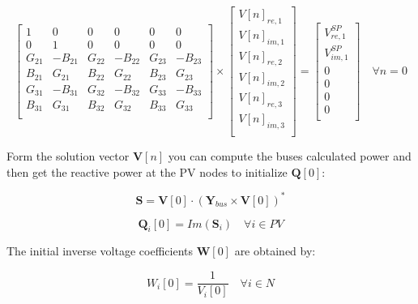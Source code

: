 \documentclass[nols,a4paper,twoside,notoc,fleqn]{tufte-book}
\begin{document}
\begin{equation}
\begin{bmatrix}
1 & 0 & 0 & 0 & 0 & 0\\
0 & 1 & 0 & 0 & 0 & 0\\
G_{21} & -B_{21} & G_{22} & -B_{22} & G_{23} & -B_{23}\\
B_{21} & G_{21}  & B_{22} & G_{22}  & B_{23} & G_{23}\\
G_{31} & -B_{31} & G_{32} & -B_{32} & G_{33} & -B_{33}\\
B_{31} & G_{31}  & B_{32} & G_{32}  & B_{33} & G_{33}\\
\end{bmatrix}
\times
\begin{bmatrix}
V[n]_{re, 1}\\
V[n]_{im, 1}\\
V[n]_{re, 2}\\
V[n]_{im, 2}\\
V[n]_{re, 3}\\
V[n]_{im, 3}\\
\end{bmatrix}
=
\begin{bmatrix}
V^{SP}_{re, 1}\\
V^{SP}_{im, 1}\\
0\\
0\\
0\\
0\\
\end{bmatrix}
\quad \forall n = 0
\end{equation}

Form the solution vector $\textbf{V}[n]$ you can compute the buses calculated power and then get the reactive power at the PV nodes to initialize $\textbf{Q}[0]$:

\begin{equation}
\textbf{S} = \textbf{V}[0] \cdot (\textbf{Y}_{bus} \times \textbf{V}[0])^*
\label{Scalc}
\end{equation}

\begin{equation}
\textbf{Q}_i[0] = Im(\textbf{S}_{i}) \quad \forall i \in PV
\end{equation}

The initial inverse voltage coefficients $\textbf{W}[0]$ are obtained by:

\begin{equation}
W_i[0] = \frac{1}{V_i[0]}  \quad \forall i \in N
\end{equation}
\end{document}

